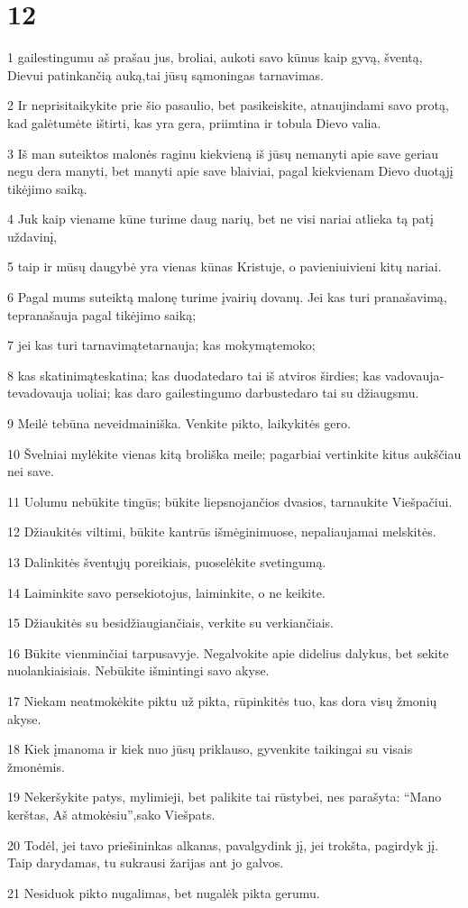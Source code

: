 \chapter{12}


\par 1 gailestingumu aš prašau jus, broliai, aukoti savo kūnus kaip gyvą, šventą, Dievui patinkančią auką,­tai jūsų sąmoningas tarnavimas. 
\par 2 Ir neprisitaikykite prie šio pasaulio, bet pasikeiskite, atnaujindami savo protą, kad galėtumėte ištirti, kas yra gera, priimtina ir tobula Dievo valia. 
\par 3 Iš man suteiktos malonės raginu kiekvieną iš jūsų nemanyti apie save geriau negu dera manyti, bet manyti apie save blaiviai, pagal kiekvienam Dievo duotąjį tikėjimo saiką. 
\par 4 Juk kaip viename kūne turime daug narių, bet ne visi nariai atlieka tą patį uždavinį, 
\par 5 taip ir mūsų daugybė yra vienas kūnas Kristuje, o pavieniui­vieni kitų nariai. 
\par 6 Pagal mums suteiktą malonę turime įvairių dovanų. Jei kas turi pranašavimą, tepranašauja pagal tikėjimo saiką; 
\par 7 jei kas turi tarnavimą­tetarnauja; kas mokymą­temoko; 
\par 8 kas skatinimą­teskatina; kas duoda­tedaro tai iš atviros širdies; kas vadovauja­tevadovauja uoliai; kas daro gailestingumo darbus­tedaro tai su džiaugsmu. 
\par 9 Meilė tebūna neveidmainiška. Venkite pikto, laikykitės gero. 
\par 10 Švelniai mylėkite vienas kitą broliška meile; pagarbiai vertinkite kitus aukščiau nei save. 
\par 11 Uolumu nebūkite tingūs; būkite liepsnojančios dvasios, tarnaukite Viešpačiui. 
\par 12 Džiaukitės viltimi, būkite kantrūs išmėginimuose, nepaliaujamai melskitės. 
\par 13 Dalinkitės šventųjų poreikiais, puoselėkite svetingumą. 
\par 14 Laiminkite savo persekiotojus, laiminkite, o ne keikite. 
\par 15 Džiaukitės su besidžiaugiančiais, verkite su verkiančiais. 
\par 16 Būkite vienminčiai tarpusavyje. Negalvokite apie didelius dalykus, bet sekite nuolankiaisiais. Nebūkite išmintingi savo akyse. 
\par 17 Niekam neatmokėkite piktu už pikta, rūpinkitės tuo, kas dora visų žmonių akyse. 
\par 18 Kiek įmanoma ir kiek nuo jūsų priklauso, gyvenkite taikingai su visais žmonėmis. 
\par 19 Nekeršykite patys, mylimieji, bet palikite tai rūstybei, nes parašyta: “Mano kerštas, Aš atmokėsiu”,­sako Viešpats. 
\par 20 Todėl, jei tavo priešininkas alkanas, pavalgydink jį, jei trokšta, pagirdyk jį. Taip darydamas, tu sukrausi žarijas ant jo galvos. 
\par 21 Nesiduok pikto nugalimas, bet nugalėk pikta gerumu.


